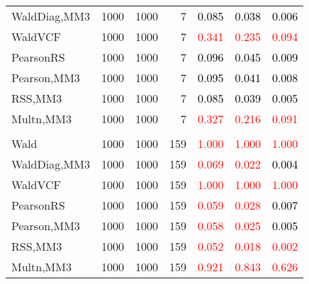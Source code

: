 \documentclass[
]{article}
\begin{document}
\begin{table}[H]
{\begin{tabular}[t]{lrrrrrr}
\hspace{1em}WaldDiag,MM3 & 1000 & 1000 & 7 & \textcolor{black}{0.085} & \textcolor{black}{0.038} & \textcolor{black}{0.006}\\
\hspace{1em}WaldVCF & 1000 & 1000 & 7 & \textcolor{red}{0.341} & \textcolor{red}{0.235} & \textcolor{red}{0.094}\\
\hspace{1em}PearsonRS & 1000 & 1000 & 7 & \textcolor{black}{0.096} & \textcolor{black}{0.045} & \textcolor{black}{0.009}\\
\hspace{1em}Pearson,MM3 & 1000 & 1000 & 7 & \textcolor{black}{0.095} & \textcolor{black}{0.041} & \textcolor{black}{0.008}\\
\hspace{1em}RSS,MM3 & 1000 & 1000 & 7 & \textcolor{black}{0.085} & \textcolor{black}{0.039} & \textcolor{black}{0.005}\\
\hspace{1em}Multn,MM3 & 1000 & 1000 & 7 & \textcolor{red}{0.327} & \textcolor{red}{0.216} & \textcolor{red}{0.091}\\
\addlinespace[0.3em]
\multicolumn{7}{l}{\textbf{1F 15V}}\\
\hspace{1em}Wald & 1000 & 1000 & 159 & \textcolor{red}{1.000} & \textcolor{red}{1.000} & \textcolor{red}{1.000}\\
\hspace{1em}WaldDiag,MM3 & 1000 & 1000 & 159 & \textcolor{red}{0.069} & \textcolor{red}{0.022} & \textcolor{black}{0.004}\\
\hspace{1em}WaldVCF & 1000 & 1000 & 159 & \textcolor{red}{1.000} & \textcolor{red}{1.000} & \textcolor{red}{1.000}\\
\hspace{1em}PearsonRS & 1000 & 1000 & 159 & \textcolor{red}{0.059} & \textcolor{red}{0.028} & \textcolor{black}{0.007}\\
\hspace{1em}Pearson,MM3 & 1000 & 1000 & 159 & \textcolor{red}{0.058} & \textcolor{red}{0.025} & \textcolor{black}{0.005}\\
\hspace{1em}RSS,MM3 & 1000 & 1000 & 159 & \textcolor{red}{0.052} & \textcolor{red}{0.018} & \textcolor{red}{0.002}\\
\hspace{1em}Multn,MM3 & 1000 & 1000 & 159 & \textcolor{red}{0.921} & \textcolor{red}{0.843} & \textcolor{red}{0.626}\\

\end{tabular}}
\end{table}
\end{document}
